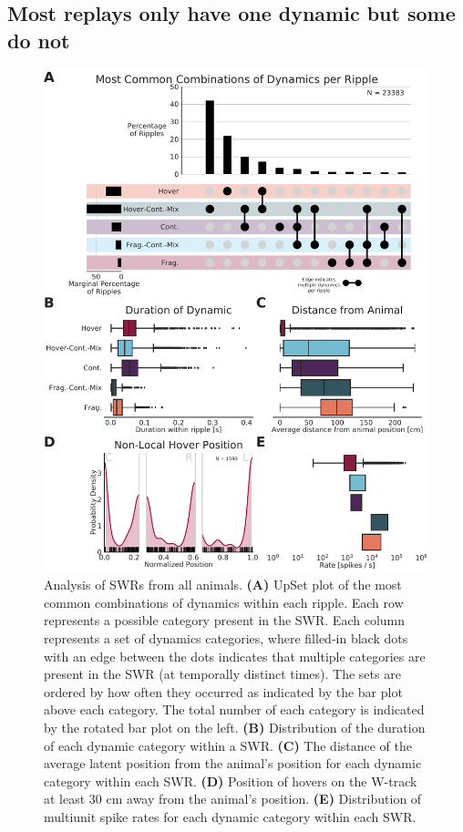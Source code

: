 \documentclass[times, twoside]{zHenriquesLab-StyleBioRxiv}
\begin{document}
\subsection*{Most replays only have one dynamic but some do not}

\begin{figure}%
\centering
\includegraphics[width=0.80\linewidth]{figures/Figure4/Figure4_v3}
\caption{
Analysis of SWRs from all animals. \textbf{(A)} UpSet plot of the most common combinations of dynamics within each ripple. Each row represents a possible category present in the SWR. Each column represents a set of dynamics categories, where filled-in black dots with an edge between the dots indicates that multiple categories are present in the SWR (at temporally distinct times). The sets are ordered by how often they occurred as indicated by the bar plot above each category. The total number of each category is indicated by the rotated bar plot on the left. \textbf{(B)} Distribution of the duration of each dynamic category within a SWR. \textbf{(C)} The distance of the average latent position from the animal's position for each dynamic category within each SWR. \textbf{(D)} Position of hovers on the W-track at least 30 cm away from the animal's position. \textbf{(E)} Distribution of multiunit spike rates for each dynamic category within each SWR.
}
\label{Figure4}
\end{figure}
\end{document}
